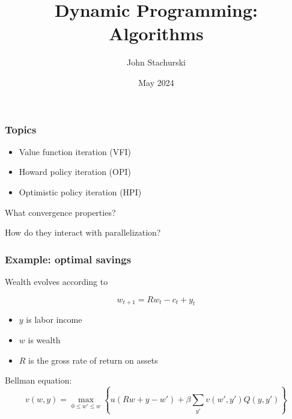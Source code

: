\documentclass[xcolor=dvipsnames]{beamer}
\date[\today]{}
\title{Dynamic Programming: Algorithms}
\author{John Stachurski}
\date{May 2024}
\renewcommand{\leq}{\leqslant}
\renewcommand{\leq}{\leqslant}
\newcommand{\1}{\mathbbm 1}
\begin{document}
\begin{frame}
  \titlepage
\end{frame}



\begin{frame}
    \frametitle{Topics}

    \begin{itemize}
        \item Value function iteration (VFI)
        \vspace{0.5em}
        \item Howard policy iteration (OPI)
        \vspace{0.5em}
        \item Optimistic policy iteration (HPI)
    \end{itemize}

        \vspace{0.5em}
        \vspace{0.5em}
        \vspace{0.5em}

    What convergence properties?
        \vspace{0.5em}

    How do they interact with parallelization? 

\end{frame}



\begin{frame}
    \frametitle{Example: optimal savings}
    
     Wealth evolves according to 

     \begin{equation*}
         w_{t+1} = Rw_t - c_t + y_t
     \end{equation*}


    \begin{itemize}
        \item $y$ is labor income
        \item $w$ is wealth
        \item $R$ is the gross rate of return on assets
    \end{itemize}

    \vspace{0.5em}
    \vspace{0.5em}
    Bellman equation:
    \begin{equation*}
        v(w, y) = 
        \max_{0 \leq w' \leq w}
        \left\{
            u(Rw + y - w') 
             + \beta \sum_{y'} v(w', y') Q(y, y')
        \right\}
    \end{equation*}


\end{frame}
\end{document}
